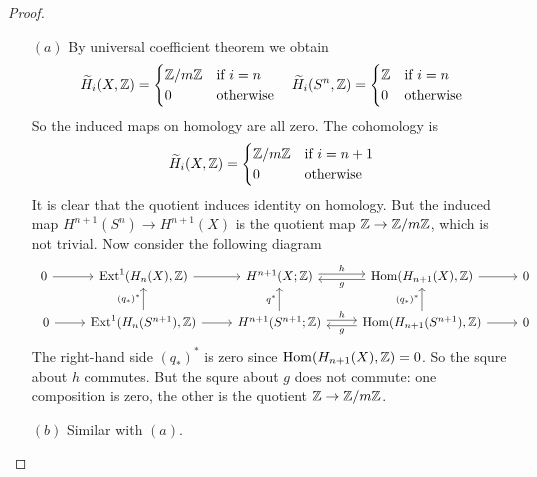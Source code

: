 \begin{proof}
\mbox{}
\begin{itemize}
\item[$(a)$]By universal coefficient theorem we obtain
\[\widetilde{H}_i(X,\mathbb{Z})=\begin{cases}
\mathbb{Z}/m\mathbb{Z}&\text{if }i=n\\
0&\text{otherwise}
\end{cases}\quad \widetilde{H}_i(S^n,\mathbb{Z})=\begin{cases}
\mathbb{Z}&\text{if }i=n\\
0&\text{otherwise}
\end{cases}\]
So the induced maps on homology are all zero. The cohomology is 
\[\widetilde{H}_i(X,\mathbb{Z})=\begin{cases}
\mathbb{Z}/m\mathbb{Z}&\text{if }i=n+1\\
0&\text{otherwise}
\end{cases}\]
It is clear that the quotient induces identity on homology. But the induced map $H^{n+1}(S^n)\to H^{n+1}(X)$ is the quotient map $\mathbb{Z}\to\mathbb{Z}/m\mathbb{Z}$, which is not trivial. Now consider the following diagram
\[\begin{tikzcd}
0\ar[r]&\Ext^1(H_{n}(X),\Z)\ar[r]&H^{n+1}(X;\Z)\ar[r,shift left=0.5 ex,"h"]&\Hom(H_{n+1}(X),\Z)\ar[l,shift left=0.5ex,"g"]\ar[r]&0\\
\
0\ar[r]&\Ext^1(H_{n}(S^{n+1}),\Z)\ar[u,"(q_*)^*"]\ar[r]&H^{n+1}(S^{n+1};\Z)\ar[u,"q^*"]\ar[r,shift left=0.5 ex,"h"]&\Hom(H_{n+1}(S^{n+1}),\Z)\ar[u,"(q_*)^*"]\ar[l,shift left=0.5ex,"g"]\ar[r]&0
\end{tikzcd}\]
The right-hand side $(q_*)^*$ is zero since $\mathrm{Hom}(H_{n+1}(X),\mathbb{Z})=0$. So the squre about $h$ commutes. But the squre about $g$ does not commute: one composition is zero, the other is the quotient $\mathbb{Z}\to\mathbb{Z}/m\mathbb{Z}$.
\item[$(b)$]Similar with $(a)$.
\end{itemize}
\end{proof}
